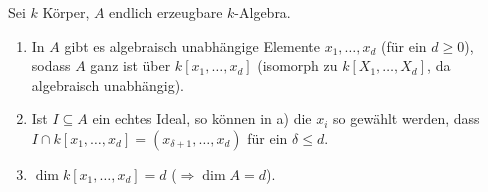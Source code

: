 \begin{Satz}
\label{11}
Sei $k$ K\"orper, $A$ endlich erzeugbare $k$-Algebra.
\begin{enumerate}
\item In $A$ gibt es algebraisch unabh\"angige Elemente $x_1, \ldots, x_d$ (f\"ur ein
$d\geq 0$), sodass $A$ ganz ist \"uber $k[x_1, \ldots, x_d]$ (isomorph zu 
$k[X_1,\ldots,X_d]$, da algebraisch unabh\"angig).
\item Ist $I\subseteq A$ ein echtes Ideal, so k\"onnen in a) die $x_i$ so
gew\"ahlt werden, dass $I\cap k[x_1, \ldots, x_d]=(x_{\delta+1},\ldots,x_d)$ f\"ur ein
$\delta \leq d$.
\item $\dim{k[x_1,\ldots,x_d]}=d$ ($\Rightarrow \dim{A} = d$).
\end{enumerate}
\end{Satz}

